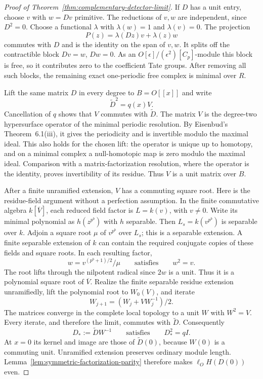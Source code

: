 \begin{proof}[Proof of Theorem~\ref{thm:complementary-detector-limit}]
If $D$ has a unit entry, choose $v$ with $w=Dv$ primitive.
The reductions of $v,w$ are independent, since $D^2=0$.
Choose a functional $\lambda$ with $\lambda(w)=1$ and
$\lambda(v)=0$.  The projection
\[
 P(z)=\lambda(Dz)v+\lambda(z)w
\]
commutes with $D$ and is the identity on the span of $v,w$.
It splits off the contractible block $Dv=w$, $Dw=0$.
As an $O[\epsilon]/(\epsilon^2)[C_p]$-module this block is free,
so it contributes zero to the coefficient Tate groups.
After removing all such blocks, the remaining exact one-periodic
free complex is minimal over $R$.

Lift the same matrix $D$ in every degree to $B=O[[x]]$ and write
\[
 \widetilde D^2=q(x)V.
\]
Cancellation of $q$ shows that $V$ commutes with $\widetilde D$.
The matrix $V$ is the degree-two hypersurface operator of the minimal
periodic resolution.  By Eisenbud's Theorem~6.1(iii), it gives the
periodicity and is invertible modulo the maximal ideal.  This also
holds for the chosen lift: the operator is unique up to homotopy,
and on a minimal complex a null-homotopic map is zero modulo the
maximal ideal.  Comparison with a matrix-factorization resolution,
where the operator is the identity, proves invertibility of its
residue.  Thus $V$ is a unit matrix over $B$.

After a finite unramified extension, $V$ has a commuting square root.
Here is the residue-field argument without a perfection assumption.
In the finite commutative algebra $k[\overline V]$, each reduced
field factor is $L=k(v)$, with $v\ne0$.  Write its minimal polynomial
as $h(z^{p^b})$ with $h$ separable.  Then
$L_s=k(v^{p^b})$ is separable over $k$.  Adjoin a square root
$\mu$ of $v^{p^b}$ over $L_s$; this is a separable extension.
A finite separable extension of $k$ can contain the required
conjugate copies of these fields and square roots.  In each resulting
factor,
\[
 w=v^{(p^b+1)/2}/\mu\qquad\text{satisfies}\qquad w^2=v.
\]
The root lifts through the nilpotent radical since $2w$ is a unit.
Thus it is a polynomial square root of $\overline V$.
Realize the finite separable residue extension unramifiedly, lift
the polynomial root to $W_0(V)$, and iterate
\[
 W_{j+1}=(W_j+VW_j^{-1})/2.
\]
The matrices converge in the complete local topology to a unit
$W$ with $W^2=V$.  Every iterate, and therefore the limit, commutes
with $\widetilde D$.  Consequently
\[
 D_*:=\widetilde D W^{-1}\qquad\text{satisfies}\qquad D_*^2=qI.
\]
At $x=0$ its kernel and image are those of $\widetilde D(0)$,
because $W(0)$ is a commuting unit.  Unramified extension preserves
ordinary module length.  Lemma~\ref{lem:symmetric-factorization-parity}
therefore makes $\ell_O H(D(0))$ even.


\end{proof}
